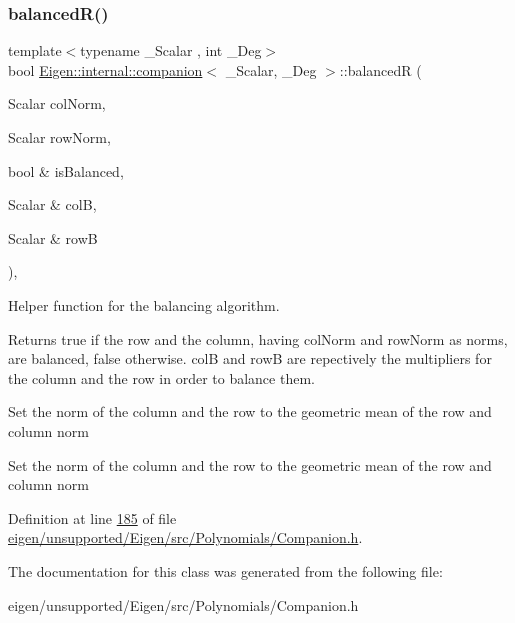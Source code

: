 \subsubsection{\texorpdfstring{balanced\+R()}{balancedR()}\hspace{0.1cm}{\footnotesize\ttfamily [2/2]}}
{\footnotesize\ttfamily template$<$typename \+\_\+\+Scalar , int \+\_\+\+Deg$>$ \\
bool \hyperlink{class_eigen_1_1internal_1_1companion}{Eigen\+::internal\+::companion}$<$ \+\_\+\+Scalar, \+\_\+\+Deg $>$\+::balancedR (\begin{DoxyParamCaption}\item[{Scalar}]{col\+Norm,  }\item[{Scalar}]{row\+Norm,  }\item[{bool \&}]{is\+Balanced,  }\item[{Scalar \&}]{colB,  }\item[{Scalar \&}]{rowB }\end{DoxyParamCaption})\hspace{0.3cm}{\ttfamily [inline]}, {\ttfamily [protected]}}

Helper function for the balancing algorithm. \begin{DoxyReturn}{Returns}
true if the row and the column, having col\+Norm and row\+Norm as norms, are balanced, false otherwise. colB and rowB are repectively the multipliers for the column and the row in order to balance them. 
\end{DoxyReturn}
Set the norm of the column and the row to the geometric mean of the row and column norm

Set the norm of the column and the row to the geometric mean of the row and column norm

Definition at line \hyperlink{eigen_2unsupported_2_eigen_2src_2_polynomials_2_companion_8h_source_l00185}{185} of file \hyperlink{eigen_2unsupported_2_eigen_2src_2_polynomials_2_companion_8h_source}{eigen/unsupported/\+Eigen/src/\+Polynomials/\+Companion.\+h}.



The documentation for this class was generated from the following file\+:\begin{DoxyCompactItemize}
\item 
eigen/unsupported/\+Eigen/src/\+Polynomials/\+Companion.\+h\end{DoxyCompactItemize}
